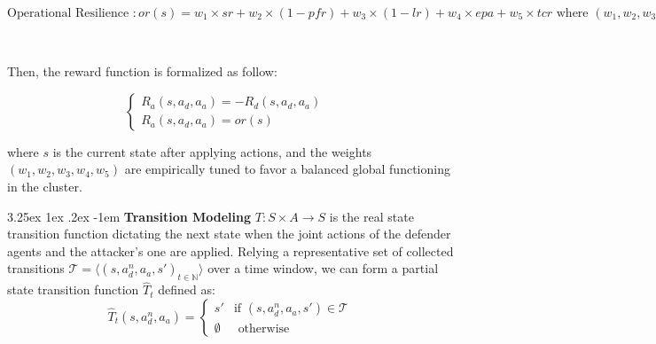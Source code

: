 \documentclass[conference]{IEEEtran}
\makeatletter
\renewcommand\paragraph{\@startsection{paragraph}{5}{\z@}%
  {3.25ex \@plus1ex \@minus.2ex}%
  {-1em}%
  {\normalfont\normalsize\bfseries}}
\makeatother
\begin{document}
\vspace{0.3cm}

$\text{Operational Resilience }: or(s) = w_1 \times sr
    \allowbreak + w_2 \times (1 - pfr)
    \allowbreak + w_3 \times (1 - lr)
    \allowbreak + w_4 \times epa
    \allowbreak + w_5 \times tcr
    \text{ where } (w_1, w_2, w_3, w_4, w_5) \text{ are relative weights.}$

\

Then, the reward function is formalized as follow:

$$
    \begin{cases}
        R_a(s, a_d, a_a) = -R_d(s, a_d, a_a) & \\
        R_a(s, a_d, a_a) = or(s)
    \end{cases}
$$

where $s$ is the current state after applying actions, and the weights $(w_1, w_2, w_3, w_4, w_5)$ are empirically tuned to favor a balanced global functioning in the cluster.


\noindent \paragraph{\textbf{Transition Modeling}} $T: S \times A \rightarrow S$ is the real state transition function dictating the next state when the joint actions of the defender agents and the attacker's one are applied. Relying a representative set of collected transitions $\mathcal{T} = \langle(s, a_d^n, a_a, s')_{t\in \mathbb{N}}\rangle$ over a time window, we can form a partial state transition function $\hat{T}_t$ defined as:
%
$$
    \hat{T}_t(s, a_d^n, a_a) =
    \begin{cases}
        s'        & \text{if } (s, a_d^n, a_a, s') \in \mathcal{T} \\
        \emptyset & \text{ otherwise}
    \end{cases}
$$
\end{document}
